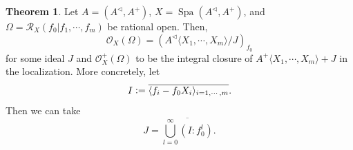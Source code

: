 \documentclass[10pt]{article}
\numberwithin{equation}{section}
\theoremstyle{definition}
\newtheorem{theorem}{Theorem} [subsection]
\DeclareMathOperator{\Spa}{Spa}
\newcommand{\defeq}{\vcentcolon=}
\newcommand{\cR}[0]{\mathcal{R}}
\newcommand{\cO}[0]{\mathcal{O}}
\newcommand{\comppol}[1]{\langle X_1,\cdots, X_{#1}\rangle}
\begin{document}
\begin{theorem}
    \label{theorem_20_3_3}
    \label{theorem_20_3_c}
    Let $A=(A^\triangleleft,A^+)$, $X=\Spa(A^\triangleleft,A^+)$, and $\Omega = \cR_X(f_0|f_1,\cdots,f_m)$ be rational open. Then,
    \begin{equation*}
        \cO_X(\Omega) = (A^\triangleleft\comppol{m}/J)_{f_0}
    \end{equation*}
    for some ideal $J$ and $\cO^+_X(\Omega)$ to be the integral closure of $A^+\comppol{m}+J$ in the localization. More concretely, let
    \begin{equation*}
        I \defeq \overline{\langle f_i-f_0X_i\rangle_{i=1,\cdots,m}}.
    \end{equation*}
    Then we can take
    \begin{equation*}
        J =\overline{\bigcup_{l=0}^\infty(I:f_0^l)}.
    \end{equation*}
\end{theorem}
\end{document}
